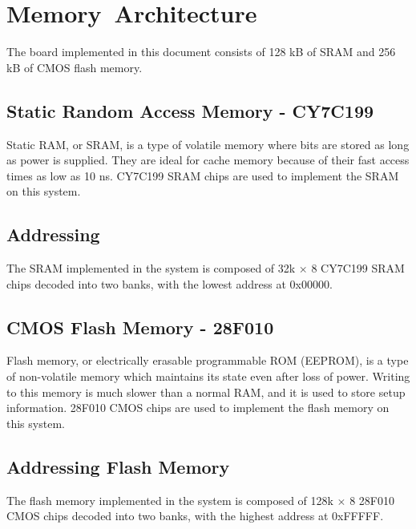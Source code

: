 \section{Memory Architecture}
The board implemented in this document consists of 128 kB of SRAM and 256 kB of CMOS flash memory.

    \subsection{Static Random Access Memory - CY7C199}
    Static RAM, or SRAM, is a type of volatile memory where bits are stored as long as power is supplied. They are ideal for cache memory because of their fast access times as low as 10 ns. CY7C199 SRAM chips are used to implement the SRAM on this system.

    \subsection{Addressing}
    The SRAM implemented in the system is composed of 32k $\times$ 8 CY7C199 SRAM chips decoded into two banks, with the lowest address at 0x00000.

    \subsection{CMOS Flash Memory - 28F010}
    Flash memory, or electrically erasable programmable ROM (EEPROM), is a type of non-volatile memory which maintains its state even after loss of power. Writing to this memory is much slower than a normal RAM, and it is used to store setup information. 28F010 CMOS chips are used to implement the flash memory on this system.

    \subsection{Addressing Flash Memory}
    The flash memory implemented in the system is composed of 128k $\times$ 8 28F010 CMOS chips decoded into two banks, with the highest address at 0xFFFFF.
